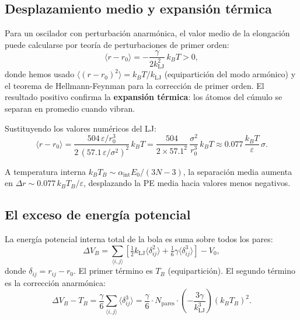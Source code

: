 \documentclass[11pt, a4paper]{article}
\begin{document}
\subsection{Desplazamiento medio y expansión térmica}

Para un oscilador con perturbación anarmónica, el valor medio de la
elongación puede calcularse por teoría de perturbaciones de primer orden:
\begin{equation}
  \langle r - r_0 \rangle = -\frac{\gamma}{2k_\text{LJ}^2}\,k_B T > 0,
  \label{eq:expansion_termica}
\end{equation}
donde hemos usado $\langle(r-r_0)^2\rangle = k_BT/k_\text{LJ}$
(equipartición del modo armónico) y el teorema de Hellmann-Feynman para
la corrección de primer orden. El resultado positivo confirma la
\textbf{expansión térmica}: los átomos del cúmulo se separan en promedio
cuando vibran.

Sustituyendo los valores numéricos del LJ:
\begin{equation}
  \langle r - r_0 \rangle
  = \frac{504\,\varepsilon/r_0^3}{2\,(57.1\,\varepsilon/\sigma^2)^2}\,k_BT
  = \frac{504}{2 \times 57.1^2}\,\frac{\sigma^2}{r_0^3}\,k_BT
  \approx 0.077\,\frac{k_BT}{\varepsilon}\,\sigma.
\end{equation}

A temperatura interna $k_BT_B \sim \alpha_\text{int} E_0 / (3N-3)$, la
separación media aumenta en $\Delta r \sim 0.077\,k_BT_B/\varepsilon$,
desplazando la PE media hacia valores menos negativos.

\subsection{El exceso de energía potencial}

La energía potencial interna total de la bola es suma sobre todos los pares:
\begin{equation}
  \Delta V_B = \sum_{\langle i,j\rangle}
               \left[\tfrac{1}{2}k_\text{LJ}\langle\delta_{ij}^2\rangle
               + \tfrac{1}{6}\gamma\langle\delta_{ij}^3\rangle\right] - V_0,
\end{equation}
donde $\delta_{ij} = r_{ij} - r_0$. El primer término es $T_B$ (equipartición).
El segundo término es la corrección anarmónica:
\begin{equation}
  \Delta V_B - T_B
  = \frac{\gamma}{6}\sum_{\langle i,j\rangle}\langle\delta_{ij}^3\rangle
  = \frac{\gamma}{6} \cdot N_\text{pares}
    \cdot \left(-\frac{3\gamma}{k_\text{LJ}^3}\right)(k_BT_B)^2.
\end{equation}
\end{document}
